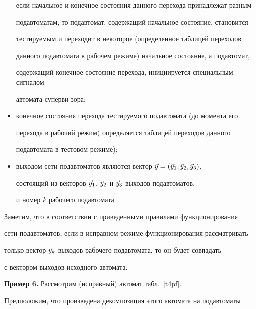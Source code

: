 \begin{multicols}{2}
\begin{itemize}
если начальное и конечное состояния данного перехода принадлежат разным


подавтоматам, то подавтомат, содержащий начальное состояние, становится


тестируемым и переходит в некоторое (определенное таблицей переходов


данного подавтомата в рабочем режиме) начальное состояние, а подавтомат,


содержащий конечное состояние перехода, инициируется специальным сигналом


автомата-суперви-\linebreak зора;


\item


конечное состояния перехода тестируемого под\-ав\-то\-ма\-та (до момента его


перехода в рабочий режим) определяется таблицей переходов данного


подавтомата в тестовом режиме);\\[-9pt]


\item


выходом сети подавтоматов являются вектор $\vec y=(\vec y_1,\vec y_2,\vec y_3)$,


состоящий из векторов $\vec y_1$, $\vec y_2$ и $\vec y_3$ выходов подавтоматов,


и номер $k$ рабочего подавтомата.\\[-9pt]


\end{itemize}





Заметим, что в соответствии с приведенными правилами функционирования


сети подавтоматов, если в исправном режиме функционирования рассматривать


только вектор $\vec y_k$ выходов рабочего под\-ав\-то\-ма\-та, то он будет совпадать


с вектором выходов исходного автомата.





\medskip


\noindent


{\bf Пример 6.} Рассмотрим (исправный) автомат табл.~\ref{t4pf}.





Предположим, что произведена декомпозиция этого автомата на подавтоматы



\end{multicols}

